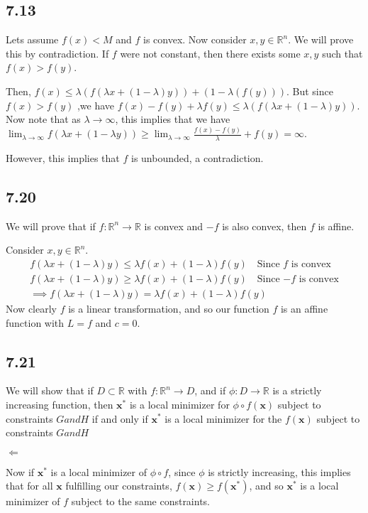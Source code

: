 \documentclass{article}
\begin{document}
	\subsection*{7.13}
	Lets assume $f(x) < M$ and $f$ is convex. Now consider $x, y \in \mathbb{R}^n$. We will prove this by contradiction. If $f$ were not constant, then there exists some $x, y$ such that $f(x) > f(y)$.
	
	Then,
	$f(x) \leq \lambda(f(\lambda x + (1-\lambda)y)) + (1 - \lambda(f(y)))$.  But since $f(x) > f(y)$ ,we have $f(x) - f(y) + \lambda f(y) \leq \lambda(f(\lambda x + (1 -\lambda)y))$. Now note that as $\lambda \to \infty$, this implies that we have $\lim_{\lambda \to \infty} f(\lambda x + ( 1- \lambda y)) \geq \lim_{\lambda \to \infty} \frac{f(x) - f(y)}{\lambda} + f(y) = \infty$.
	
	However, this implies that $f$ is unbounded, a contradiction.
	
	\subsection*{7.20}
	We will prove that if $f: \mathbb{R}^n \to \mathbb{R}$ is convex and $-f$ is also convex, then $f$ is affine. 
	
	Consider $x, y \in \mathbb{R}^n$. 
	\begin{align*}
	f(\lambda x + (1 -\lambda)y) \leq \lambda f(x) + (1 -\lambda) f(y) \quad \text{Since $f$ is convex} \\
	f(\lambda x + (1 -\lambda)y) \geq \lambda f(x) + (1 -\lambda) f(y) \quad \text{Since $-f$ is convex} \\
	\implies f(\lambda x + (1 -\lambda)y) = \lambda f(x) + (1 -\lambda) f(y)
	\end{align*}
	Now clearly $f$ is a linear transformation, and so our function $f$ is an affine function with $L = f$ and $c = 0$. 
	
	\subsection*{7.21}
	We will show that if $D \subset \mathbb{R}$ with $f:\mathbb{R}^n \to D$, and if $\phi: D \to \mathbb{R}$ is a strictly increasing function, then $\mathbf{x}^*$ is a local minimizer for $\phi \circ f(\mathbf{x})$ subject to constraints $G and H$ if and only if $\mathbf{x}^*$ is a local minimizer for the $f(\mathbf{x})$ subject to constraints $G and H$
	
	$\Leftarrow$
	
	Now if $\mathbf{x}^*$ is a local minimizer of $\phi \circ f$, since $\phi$ is strictly increasing, this implies that for all $\mathbf{x}$ fulfilling our constraints, $f(\mathbf{x}) \geq f(\mathbf{x}^*)$, and so $\mathbf{x}^*$ is a local minimizer of $f$ subject to the same constraints.
	
\end{document}
